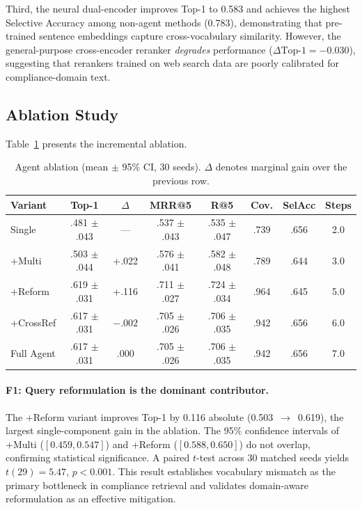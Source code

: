 \documentclass{sn-jnl}
\begin{document}
Third, the neural dual-encoder improves Top-1 to 0.583 and achieves the highest Selective Accuracy among non-agent methods (0.783), demonstrating that pre-trained sentence embeddings capture cross-vocabulary similarity.
However, the general-purpose cross-encoder reranker \emph{degrades} performance ($\Delta\text{Top-1} = -0.030$), suggesting that rerankers trained on web search data are poorly calibrated for compliance-domain text.


\subsection{Ablation Study}

Table~\ref{tab:ablation} presents the incremental ablation.

\begin{table}[t]
\caption{Agent ablation (mean $\pm$ 95\% CI, 30 seeds). $\Delta$ denotes marginal gain over the previous row.}
\label{tab:ablation}
\centering
\small
\begin{tabular}{@{}lccccccc@{}}
\toprule
Variant & Top-1 & $\Delta$ & MRR@5 & R@5 & Cov. & SelAcc & Steps \\
\midrule
Single        & .481 $\pm$ .043 & ---    & .537 $\pm$ .043 & .535 $\pm$ .047 & .739 & .656 & 2.0 \\
+Multi        & .503 $\pm$ .044 & +.022  & .576 $\pm$ .041 & .582 $\pm$ .048 & .789 & .644 & 3.0 \\
+Reform       & .619 $\pm$ .031 & +.116  & .711 $\pm$ .027 & .724 $\pm$ .034 & .964 & .645 & 5.0 \\
+CrossRef     & .617 $\pm$ .031 & $-.002$  & .705 $\pm$ .026 & .706 $\pm$ .035 & .942 & .656 & 6.0 \\
Full Agent    & .617 $\pm$ .031 & .000   & .705 $\pm$ .026 & .706 $\pm$ .035 & .942 & .656 & 7.0 \\
\bottomrule
\end{tabular}
\end{table}


\paragraph{F1: Query reformulation is the dominant contributor.}
The +Reform variant improves Top-1 by 0.116 absolute (0.503~$\rightarrow$~0.619), the largest single-component gain in the ablation.
The 95\% confidence intervals of +Multi ($[0.459, 0.547]$) and +Reform ($[0.588, 0.650]$) do not overlap, confirming statistical significance.
A paired $t$-test across 30 matched seeds yields $t(29) = 5.47$, $p < 0.001$.
This result establishes vocabulary mismatch as the primary bottleneck in compliance retrieval and validates domain-aware reformulation as an effective mitigation.
\end{document}
